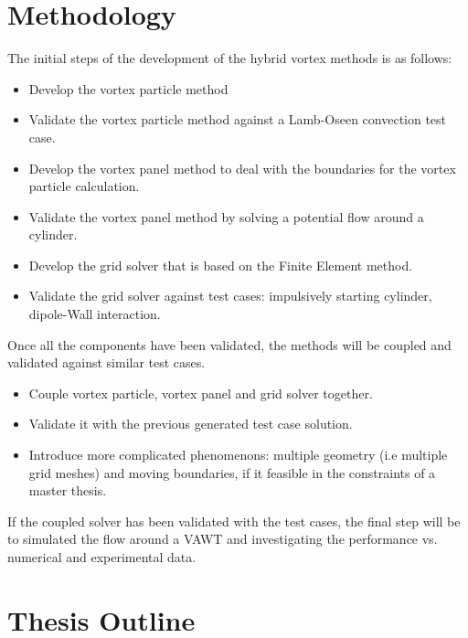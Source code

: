 \section{Methodology}
The initial steps of the development of the hybrid vortex methods is as follows:

	\begin{itemize}
	\item Develop the vortex particle method
	\item Validate the vortex particle method against a Lamb-Oseen convection test case.
	\item Develop the vortex panel method to deal with the boundaries for the vortex particle calculation. 
	\item Validate the vortex panel method by solving a potential flow around a cylinder.
	\item Develop the grid solver that is based on the Finite Element method. 
	\item Validate the grid solver against test cases: impulsively starting cylinder, dipole-Wall interaction.
	\end{itemize}

Once all the components have been validated, the methods will be coupled and validated against similar test cases.

	\begin{itemize}
	\item Couple vortex particle, vortex panel and grid solver together.
	\item Validate it with the previous generated test case solution.
	\item Introduce more complicated phenomenons: multiple geometry (i.e multiple grid meshes) and moving boundaries, if it feasible in the constraints of a master thesis.
	\end{itemize}

If the coupled solver has been validated with the test cases, the final step will be to simulated the flow around a VAWT and investigating the performance vs. numerical and experimental data.


\section{Thesis Outline}

